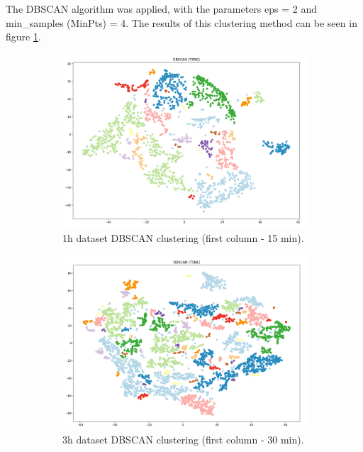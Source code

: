 The DBSCAN algorithm was applied, with the parameters eps = 2 and min\_samples (MinPts) = 4. The results of this clustering method can be seen in figure \ref{figure:DBSCANResults}.


\begin{figure}[H]
  \centering
  \begin{subfigure}{.5\textwidth}\captionsetup{width=.8\linewidth}
    \centering
    \includegraphics[width=1\textwidth]{./images/clusteringResults/1h-1-DBSCAN.png}
  \caption{1h dataset DBSCAN clustering (first column - 15 min).}
  \end{subfigure}%
  \hfill
  \begin{subfigure}{.5\textwidth}\captionsetup{width=.8\linewidth}
    \centering
    \includegraphics[width=1\textwidth]{./images/clusteringResults/3h-1-DBSCAN.png}
    \caption{3h dataset DBSCAN clustering (first column - 30 min).}
  \end{subfigure}
  \caption{}
  \label{figure:DBSCANResults}
  \end{figure}






